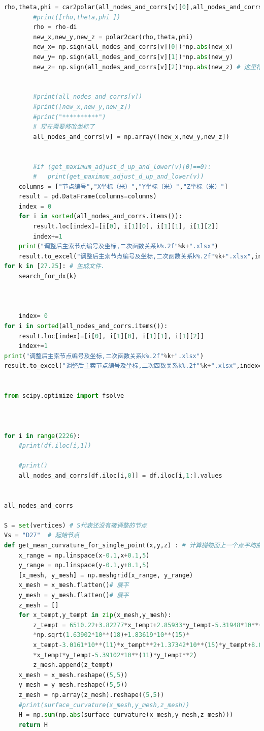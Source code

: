 \documentclass[withoutpreface,bwprint]{cumcmthesis} %
\begin{document}
\begin{appendices}
\begin{lstlisting}[language=python]
        rho,theta,phi = car2polar(all_nodes_and_corrs[v][0],all_nodes_and_corrs[v][1],all_nodes_and_corrs[v][2])
        #print([rho,theta,phi ])
        rho = rho-di
        new_x,new_y,new_z = polar2car(rho,theta,phi)
        new_x= np.sign(all_nodes_and_corrs[v][0])*np.abs(new_x)
        new_y= np.sign(all_nodes_and_corrs[v][1])*np.abs(new_y)
        new_z= np.sign(all_nodes_and_corrs[v][2])*np.abs(new_z) # 这里符号计算有点问题，但是小幅度的转换并不会影响到角度
        
        
        #print(all_nodes_and_corrs[v])
        #print([new_x,new_y,new_z])
        #print("**********")
        # 现在需要修改坐标了
        all_nodes_and_corrs[v] = np.array([new_x,new_y,new_z])
        
        
        #if (get_maximum_adjust_d_up_and_lower(v)[0]==0):
        #   print(get_maximum_adjust_d_up_and_lower(v))
    columns = ["节点编号","X坐标（米）","Y坐标（米）","Z坐标（米）"]
    result = pd.DataFrame(columns=columns)
    index = 0
    for i in sorted(all_nodes_and_corrs.items()):
        result.loc[index]=[i[0], i[1][0], i[1][1], i[1][2]]  
        index+=1
    print("调整后主索节点编号及坐标,二次函数关系k%.2f"%k+".xlsx")
    result.to_excel("调整后主索节点编号及坐标,二次函数关系k%.2f"%k+".xlsx",index=False)
for k in [27.25]: # 生成文件.
    search_for_dx(k)



    index= 0
for i in sorted(all_nodes_and_corrs.items()):
    result.loc[index]=[i[0], i[1][0], i[1][1], i[1][2]]  
    index+=1
print("调整后主索节点编号及坐标,二次函数关系k%.2f"%k+".xlsx")
result.to_excel("调整后主索节点编号及坐标,二次函数关系k%.2f"%k+".xlsx",index=False)


from scipy.optimize import fsolve



for i in range(2226):
    #print(df.iloc[i,1])

    #print()
    all_nodes_and_corrs[df.iloc[i,0]] = df.iloc[i,1:].values

    
all_nodes_and_corrs    

S = set(vertices) # S代表还没有被调整的节点
Vs = "D27"  # 起始节点
def get_mean_curvature_for_single_point(x,y,z) : # 计算抛物面上一个点平均曲率
    x_range = np.linspace(x-0.1,x+0.1,5)
    y_range = np.linspace(y-0.1,y+0.1,5)
    [x_mesh, y_mesh] = np.meshgrid(x_range, y_range)
    x_mesh = x_mesh.flatten()# 展平
    y_mesh = y_mesh.flatten()# 展平
    z_mesh = [] 
    for x_tempt,y_tempt in zip(x_mesh,y_mesh):
        z_tempt = 6510.22+3.82277*x_tempt+2.85933*y_tempt-5.31948*10**(-6)
        *np.sqrt(1.63902*10**(18)+1.83619*10**(15)*
        x_tempt-3.0161*10**(11)*x_tempt**2+1.37342*10**(15)*y_tempt+8.06466*10**(11)
        *x_tempt*y_tempt-5.39102*10**(11)*y_tempt**2)
        z_mesh.append(z_tempt)
    x_mesh = x_mesh.reshape((5,5))
    y_mesh = y_mesh.reshape((5,5))
    z_mesh = np.array(z_mesh).reshape((5,5))
    #print(surface_curvature(x_mesh,y_mesh,z_mesh))
    H = np.sum(np.abs(surface_curvature(x_mesh,y_mesh,z_mesh)))
    return H


\end{lstlisting}
\end{appendices}
\end{document}
